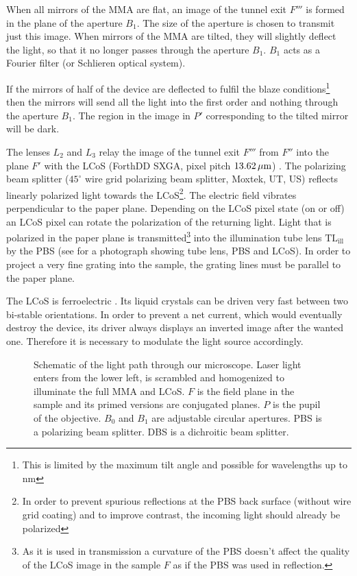 When all mirrors of the MMA are flat, an image of the tunnel exit $F'''$
is formed in the plane of the aperture $B_1$. The size of the aperture
is chosen to transmit just this image. When mirrors of the MMA are
tilted, they will slightly deflect the light, so that it no longer
passes through the aperture $B_1$. $B_1$ acts as a Fourier filter (or
Schlieren optical system).

If the mirrors of half of the device are deflected to fulfil the blaze
conditions\footnote{This is limited by the maximum tilt angle and
  possible for wavelengths up to \unit[1000]{nm}} then the mirrors will
send all the light into the first order and nothing through the
aperture $B_1$.  The region in the image in $P'$ corresponding to the
tilted mirror will be dark.

The lenses $L_2$ and $L_3$ relay the image of the tunnel exit $F'''$
from $F''$ into the plane $F'$ with the LCoS (ForthDD SXGA, pixel
pitch $\unit[13.62]{\mu m}$) \citep{Cartwright2007}. The polarizing
beam splitter ($45^\circ$ wire grid polarizing beam splitter, Moxtek,
UT, US) reflects linearly polarized light towards the LCoS\footnote{In
  order to prevent spurious reflections at the PBS back surface
  (without wire grid coating) and to improve contrast, the incoming
  light should already be polarized}. The electric field vibrates
perpendicular to the paper plane. Depending on the LCoS pixel state
(on or off) an LCoS pixel can rotate the polarization of the returning
light. Light that is polarized in the paper plane is
transmitted\footnote{As it is used in transmission a curvature of the
  PBS doesn't affect the quality of the LCoS image in the sample $F$
  as if the PBS was used in reflection.}  into the illumination tube
lens $\textrm{TL}_\textrm{ill}$ by the PBS (see  for
a photograph showing tube lens, PBS and LCoS). In order to project a
very fine grating into the sample, the grating lines must be parallel
to the paper plane.

The LCoS is ferroelectric \citetext{\citealp[see][]{1991Saleh} and
  \citealp[p.~192]{Goodman1996}}.  Its liquid crystals can be driven
very fast between two bi-stable orientations. In order to prevent a
net current, which would eventually destroy the device, its driver
always displays an inverted image after the wanted one. Therefore it
is necessary to modulate the light source accordingly.


\begin{figure}[H]
  \centering
  \def\svgscale{2}
  
  \caption{Schematic of the light path through our microscope. Laser
    light enters from the lower left, is scrambled and homogenized to
    illuminate the full MMA and LCoS. $F$ is the field plane in the
    sample and its primed versions are conjugated planes. $P$ is the
    pupil of the objective. $B_0$ and $B_1$ are adjustable circular
    apertures. PBS is a polarizing beam splitter. DBS is a dichroitic
    beam splitter.}
  \label{fig:memi-real}
\end{figure}


